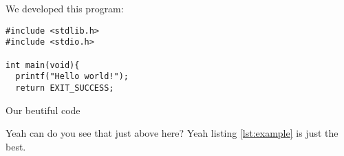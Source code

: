 \chapter{\solutionname}
We developed this program:

\begin{listing}[H]
\begin{verbatim}
#include <stdlib.h>
#include <stdio.h>

int main(void){
  printf("Hello world!");
  return EXIT_SUCCESS;
\end{verbatim}
\caption{Our beutiful code}
\label{lst:example}
\end{listing}

Yeah can do you see that just above here?
Yeah listing \ref{lst:example} is just the best.

